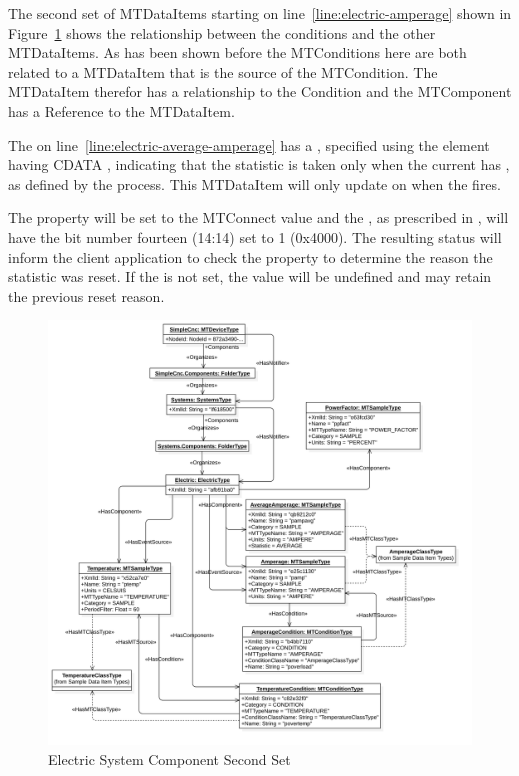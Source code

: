 The second set of \glspl{MTDataItem} starting on line~\ref{line:electric-amperage} shown in Figure~\ref{fig:electric-system-2} shows the relationship between the conditions and the other \glspl{MTDataItem}. As has been shown before the \glspl{MTCondition} here are both related to a \gls{MTDataItem} that is the source of the \gls{MTCondition}. The \gls{MTDataItem} therefor has a  relationship to the \gls{Condition} and the \gls{MTComponent} has a  \gls{Reference} to the \gls{MTDataItem}. 

The  on line~\ref{line:electric-average-amperage} has a , specified using the  element having \gls{CDATA} , indicating that the  statistic is taken only when the current  has , as defined by the process. This \gls{MTDataItem} will only update on when the  fires.

The property  will be set to the MTConnect value and the , as prescribed in \cite{UAPart4}, will have the  bit number fourteen (14:14) set to 1 (0x4000). The resulting status will inform the client application to check the  property to determine the reason the statistic was reset. If the  is not set, the  value will be undefined and may retain the previous reset reason.

\begin{figure}[ht]
  \centering
  \includegraphics[width=1.0\textwidth]{diagrams/mtconnect-mapping/electric-system-2.png}
  \caption{Electric System Component Second Set}
  \label{fig:electric-system-2}
\end{figure}

